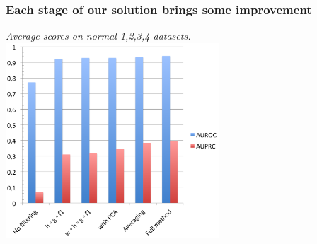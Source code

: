 \documentclass[final]{beamer}
\begin{document}
\begin{frame}
\frametitle{Each stage of our solution brings some improvement}


\begin{center}
\textit{Average scores on normal-{1,2,3,4} datasets.
}
\includegraphics[width=8cm]{images/data_stage.png}
\end{center}




\end{frame}
\end{document}
